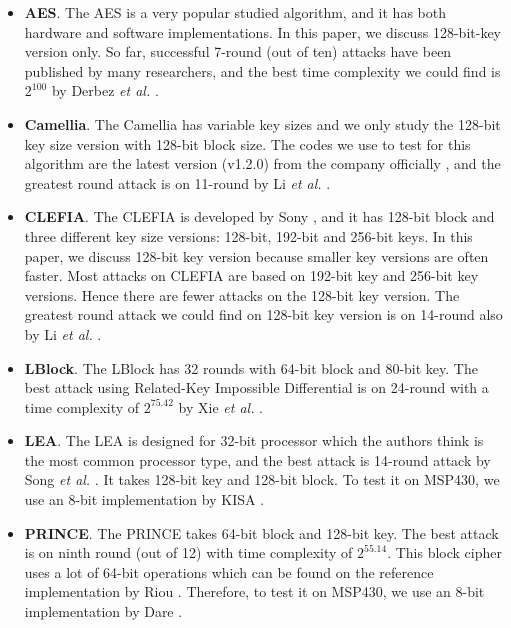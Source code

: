 \documentclass[sigconf, review=false]{acmart}
\begin{document}
\begin{itemize}
    \item
\textbf{AES}. The AES \cite{pub2001197} is a very popular studied algorithm, and it has both hardware and software implementations.
In this paper, we discuss 128-bit-key version only. So far, successful 7-round (out of ten) attacks have been published by many researchers,
and the best time complexity we could find is $2^{100}$ by Derbez \textit{et al.} \cite{derbez2013improved}.

    \item
\textbf{Camellia}. The Camellia \cite{aoki2000camellia} has variable key sizes and we only study the 128-bit key size version with 128-bit block size.
The codes we use to test for this algorithm are the latest version (v1.2.0) from the company officially \cite{ntt2007},
and the greatest round attack is on 11-round by Li \textit{et al.} \cite{li2015meet}.

    \item
\textbf{CLEFIA}. The CLEFIA \cite{shirai2007128} is developed by Sony \cite{sony2008},
and it has 128-bit block and three different key size versions: 128-bit, 192-bit and 256-bit keys.
In this paper, we discuss 128-bit key version because smaller key versions are often faster.
Most attacks on CLEFIA are based on 192-bit key and 256-bit key versions. Hence there are fewer attacks on the 128-bit key version.
The greatest round attack we could find on 128-bit key version is on 14-round also by Li \textit{et al.} \cite{li2015meet}.

    \item
\textbf{LBlock}. The LBlock \cite{wu2011lblock} has 32 rounds with 64-bit block and 80-bit key.
The best attack using Related-Key Impossible Differential is on 24-round with a time complexity of $2^{75.42}$ by Xie \textit{et al.} \cite{xie2017related}.

    \item
\textbf{LEA}. The LEA \cite{hong2013lea} is designed for 32-bit processor which the authors think is the most common processor type,
and the best attack is 14-round attack by Song \textit{et al.} \cite{song2016automatic}.
It takes 128-bit key and 128-bit block. To test it on MSP430, we use an 8-bit implementation by KISA \cite{kisa2015}.

    \item
\textbf{PRINCE}. The PRINCE \cite{borghoff2012prince} takes 64-bit block and 128-bit key.
The best attack is on ninth round (out of 12) with time complexity of $2^{55.14}$.
This block cipher uses a lot of 64-bit operations which can be found on the reference implementation by Riou \cite{sebastienriou2016}.
Therefore, to test it on MSP430, we use an 8-bit implementation by Dare \cite{chrisdare2016}.


\end{itemize}
\end{document}
